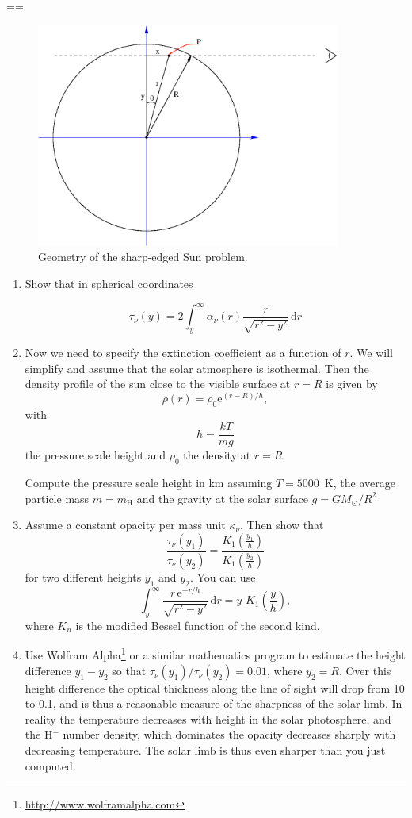 \documentclass[12pt]{article}
\numberwithin{equation}{section}
\def\exp{\mathrm{e}}
\def\dd{\mathrm{d}}
\newcommand{\be}{\begin{equation}}
\newcommand{\ee}{\end{equation}}
\newcounter{vraag}	\newcounter{lastvraag}
\newenvironment{opgaven}%
    {\begin{list}{\arabic{vraag}.}{\usecounter{vraag}%
        \listparindent=\parindent \parsep=\parskip}}%
    {\setcounter{lastvraag}{\value{vraag}} \end{list}}
\begin{document}
\begin{opgaven}
\begin{figure}
     \includegraphics[width=10cm]{figs/sharp-edge-star}
    \caption{Geometry of the sharp-edged Sun problem.}  \label{fig:sharp-edge-star}
\end{figure}

\begin{enumerate} [label=(\alph*)]
\item
Show that in spherical coordinates

\begin{equation}
\tau_\nu(y) = 2 \int_y^\infty \alpha_\nu(r)  \frac{r}{\sqrt{r^2-y^2}} \, \dd r
\end{equation}

\item Now we need to specify the extinction coefficient as a function of $r$. We will simplify and assume that the solar atmosphere is isothermal. Then the density profile of the sun close to the visible surface at $r=R$ is given by
\be
\rho(r) = \rho_0 \exp^{(r-R)/h},
\ee
with \be
h = \frac{kT}{mg}
\ee
the pressure scale height and $\rho_0$ the density at $r=R$.

Compute the pressure scale height in km assuming $T=5000$~K, the average particle mass $m= m_\mathrm{H}$ and the gravity at the solar surface $g=GM_\odot / R^2$

\item Assume a constant opacity per mass unit $\kappa_\nu$. Then show that 
\be
\frac{\tau_\nu(y_1)}{\tau_\nu(y_2)} =  \frac{K_1(\frac{y_1}{h})}{K_1(\frac{y_2}{h})}
\ee
for two different heights $y_1$ and $y_2$. You can use
\be
\int_y^\infty \frac{r \, \exp^{-r/h} }{\sqrt{r^2-y^2}} \, \dd r = y \, \, K_1(\frac{y}{h}),
\ee
where $K_n$ is the modified Bessel function of the second kind.

\item Use Wolfram Alpha\footnote{\url{http://www.wolframalpha.com}} or a similar mathematics program to estimate the height difference $y_1-y_2$ so that 
$\tau_\nu(y_1) / \tau_\nu(y_2) = 0.01$, where $y_2=R$. Over this height difference the optical thickness along the line of sight will drop from 10 to 0.1, and is thus a reasonable measure of the sharpness of the solar limb.
In reality the temperature decreases with height in the solar photosphere, and the H$^-$ number density, which dominates the opacity decreases sharply with decreasing temperature. The solar limb is thus even sharper than you just computed.


\end{enumerate}
\end{opgaven}
\end{document}

